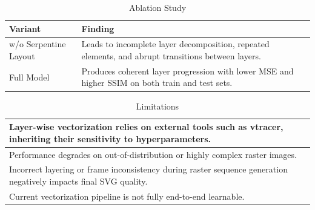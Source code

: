 \begin{table}[h!]
\centering
\caption{Ablation Study}
\begin{tabular}{|l|p{10cm}|}
\hline
\textbf{Variant} & \textbf{Finding} \\ \hline
w/o Serpentine Layout &
Leads to incomplete layer decomposition, repeated elements, and abrupt transitions between layers. \\ \hline
Full Model &
Produces coherent layer progression with lower MSE and higher SSIM on both train and test sets. \\ \hline
\end{tabular}
\end{table}

\begin{table}[h!]
\centering
\caption{Limitations}
\begin{tabular}{|p{14cm}|}
\hline
Layer-wise vectorization relies on external tools such as vtracer, inheriting their sensitivity to hyperparameters. \\ \hline
Performance degrades on out-of-distribution or highly complex raster images. \\ \hline
Incorrect layering or frame inconsistency during raster sequence generation negatively impacts final SVG quality. \\ \hline
Current vectorization pipeline is not fully end-to-end learnable. \\ \hline
\end{tabular}
\end{table}
